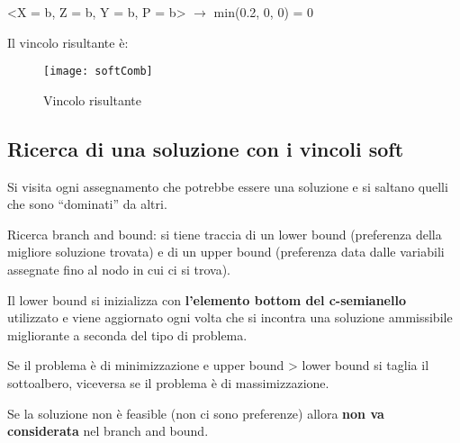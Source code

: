 <X = b, Z = b, Y = b, P = b> $\rightarrow$ min(0.2, 0, 0) = 0

Il vincolo risultante è:

\begin{figure}[H]
\centering
\texttt{[image: softComb]}
\caption{Vincolo risultante}
\end{figure}

\subsection{Ricerca di una soluzione con i vincoli soft}

Si visita ogni assegnamento che potrebbe essere una soluzione e si saltano
quelli che sono ``dominati'' da altri.

Ricerca branch and bound: si tiene traccia di un lower bound (preferenza
della migliore soluzione trovata) e di un upper bound (preferenza data dalle
variabili assegnate fino al nodo in cui ci si trova).

Il lower bound si inizializza con \textbf{l'elemento bottom del c-semianello}
utilizzato e viene aggiornato ogni volta che si incontra una soluzione
ammissibile migliorante a seconda del tipo di problema.

Se il problema è di minimizzazione e upper bound > lower bound si taglia il
sottoalbero, viceversa se il problema è di massimizzazione.

Se la soluzione non è feasible (non ci sono preferenze) allora
\textbf{non va considerata} nel branch and bound.
